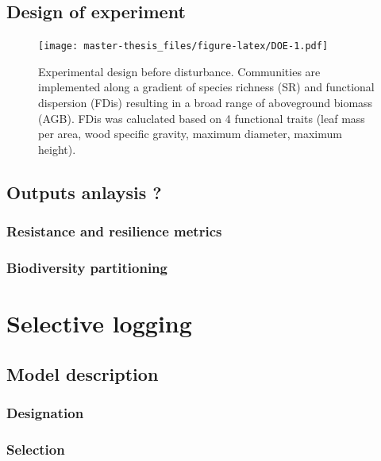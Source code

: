 \documentclass[]{article}
\theoremstyle{definition}
\theoremstyle{definition}
\theoremstyle{remark}
\begin{document}
\subsection{Design of experiment}\label{design-of-experiment}

\begin{figure}[htbp]
\centering
\texttt{[image: master-thesis\_files/figure-latex/DOE-1.pdf]}
\caption{\label{fig:DOE}Experimental design before disturbance. Communities
are implemented along a gradient of species richness (SR) and functional
dispersion (FDis) resulting in a broad range of aboveground biomass
(AGB). FDis was caluclated based on 4 functional traits (leaf mass per
area, wood specific gravity, maximum diameter, maximum height).}
\end{figure}

\subsection{Outputs anlaysis ?}\label{outputs-anlaysis}

\subsubsection{Resistance and resilience
metrics}\label{resistance-and-resilience-metrics}

\subsubsection{Biodiversity
partitioning}\label{biodiversity-partitioning}

\section{Selective logging}\label{selective-logging}

\subsection{Model description}\label{model-description-2}

\subsubsection{Designation}\label{designation}

\subsubsection{Selection}\label{selection}
\end{document}

